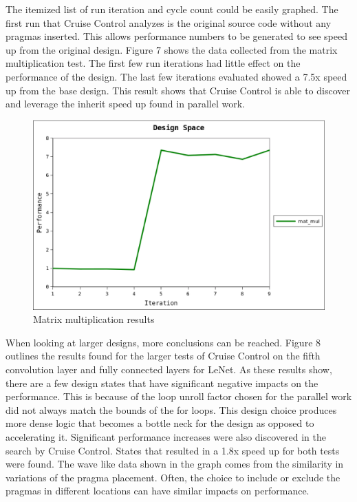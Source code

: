 \documentclass[letterpaper, 10 pt, conference]{IEEEconf}  %
\begin{document}
The itemized list of run iteration and cycle count could be easily graphed. The first run that Cruise Control analyzes is the original source code without any pragmas inserted. This allows performance numbers to be generated to see speed up from the original design. Figure 7 shows the data collected from the matrix multiplication test. The first few run iterations had little effect on the performance of the design. The last few iterations evaluated showed a 7.5x speed up from the base design. This result shows that Cruise Control is able to discover and leverage the inherit speed up found in parallel work. \newline 

\begin{figure}[H]
\centering
\includegraphics[scale=.4]{result1.png} 
\caption{Matrix multiplication results}
\end{figure}

When looking at larger designs, more conclusions can be reached. Figure 8 outlines the results found for the larger tests of Cruise Control on the fifth convolution layer and fully connected layers for LeNet. As these results show, there are a few design states that have significant negative impacts on the performance. This is because of the loop unroll factor chosen for the parallel work did not always match the bounds of the for loops. This design choice produces more dense logic that becomes a bottle neck for the design as opposed to accelerating it. Significant performance increases were also discovered in the search by Cruise Control. States that resulted in a 1.8x speed up for both tests were found. The wave like data shown in the graph comes from the similarity in variations of the pragma placement. Often, the choice to include or exclude the pragmas in different locations can have similar impacts on performance. \newline
\end{document}
